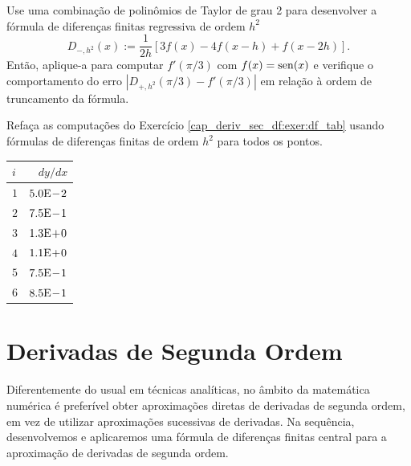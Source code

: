 \begin{exer}
  Use uma combinação de polinômios de Taylor de grau 2 para desenvolver a fórmula de diferenças finitas regressiva de ordem $h^2$
  \begin{equation}\label{cap_deriv_sec_df:eq:dfr_h2}
    D_{-,h^2}(x) := \frac{1}{2h}\left[3f(x) - 4f(x-h) + f(x-2h)\right].
  \end{equation}
  Então, aplique-a para computar $f'(\pi/3)$ com $f(x)=\operatorname{sen}(x)$ e verifique o comportamento do erro $|D_{+,h^2}(\pi/3) - f'(\pi/3)|$ em relação à ordem de truncamento da fórmula.
\end{exer}

\begin{exer}
  Refaça as computações do Exercício \ref{cap_deriv_sec_df:exer:df_tab} usando fórmulas de diferenças finitas de ordem $h^2$ para todos os pontos.
\end{exer}
\begin{resp}
  \begin{center}
    \begin{tabular}{l|r}
      $i$ & $dy/dx$\\\hline
      $1$ & $5.0\mathrm{E}\!-\!2$\\
      $2$ & $7.5\mathrm{E}\!-\!1$\\
      $3$ & $1.3\mathrm{E}\!+\!0$\\
      $4$ & $1.1\mathrm{E}\!+\!0$\\
      $5$ & $7.5\mathrm{E}\!-\!1$\\
      $6$ & $8.5\mathrm{E}\!-\!1$\\\hline
    \end{tabular}
  \end{center}  
\end{resp}

\section{Derivadas de Segunda Ordem}\label{cap_deriv_sec_d2f}

Diferentemente do usual em técnicas analíticas, no âmbito da matemática numérica é preferível obter aproximações diretas de derivadas de segunda ordem, em vez de utilizar aproximações sucessivas de derivadas. Na sequência, desenvolvemos e aplicaremos uma fórmula de diferenças finitas central para a aproximação de derivadas de segunda ordem.

